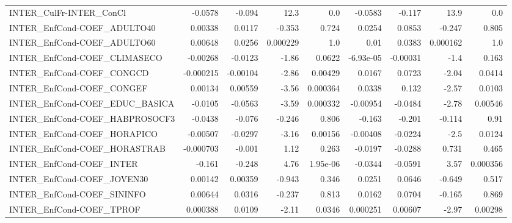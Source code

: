 \begin{tabular}{lrrrrrrrr}
INTER\_CulFr-INTER\_ConCl                &     -0.0578 &       -0.094 &     12.3 &      0.0 &    -0.0583 &      -0.117 &         13.9 &           0.0 \\
INTER\_EnfCond-COEF\_ADULTO40            &     0.00338 &       0.0117 &   -0.353 &    0.724 &     0.0254 &      0.0853 &       -0.247 &         0.805 \\
INTER\_EnfCond-COEF\_ADULTO60            &     0.00648 &       0.0256 & 0.000229 &      1.0 &       0.01 &      0.0383 &     0.000162 &           1.0 \\
INTER\_EnfCond-COEF\_CLIMASECO           &    -0.00268 &      -0.0123 &    -1.86 &   0.0622 &  -6.93e-05 &    -0.00031 &         -1.4 &         0.163 \\
INTER\_EnfCond-COEF\_CONGCD              &   -0.000215 &     -0.00104 &    -2.86 &  0.00429 &     0.0167 &      0.0723 &        -2.04 &        0.0414 \\
INTER\_EnfCond-COEF\_CONGEF              &     0.00134 &      0.00559 &    -3.56 & 0.000364 &     0.0338 &       0.132 &        -2.57 &        0.0103 \\
INTER\_EnfCond-COEF\_EDUC\_BASICA         &     -0.0105 &      -0.0563 &    -3.59 & 0.000332 &   -0.00954 &     -0.0484 &        -2.78 &       0.00546 \\
INTER\_EnfCond-COEF\_HABPROSOCF3         &     -0.0438 &       -0.076 &   -0.246 &    0.806 &     -0.163 &      -0.201 &       -0.114 &          0.91 \\
INTER\_EnfCond-COEF\_HORAPICO            &    -0.00507 &      -0.0297 &    -3.16 &  0.00156 &   -0.00408 &     -0.0224 &         -2.5 &        0.0124 \\
INTER\_EnfCond-COEF\_HORASTRAB           &   -0.000703 &       -0.001 &     1.12 &    0.263 &    -0.0197 &     -0.0288 &        0.731 &         0.465 \\
INTER\_EnfCond-COEF\_INTER               &      -0.161 &       -0.248 &     4.76 & 1.95e-06 &    -0.0344 &     -0.0591 &         3.57 &      0.000356 \\
INTER\_EnfCond-COEF\_JOVEN30             &     0.00142 &      0.00359 &   -0.943 &    0.346 &     0.0251 &      0.0646 &       -0.649 &         0.517 \\
INTER\_EnfCond-COEF\_SININFO             &     0.00644 &       0.0316 &   -0.237 &    0.813 &     0.0162 &      0.0704 &       -0.165 &         0.869 \\
INTER\_EnfCond-COEF\_TPROF               &    0.000388 &       0.0109 &    -2.11 &   0.0346 &   0.000251 &     0.00607 &        -2.97 &       0.00298 \\

\end{tabular}
